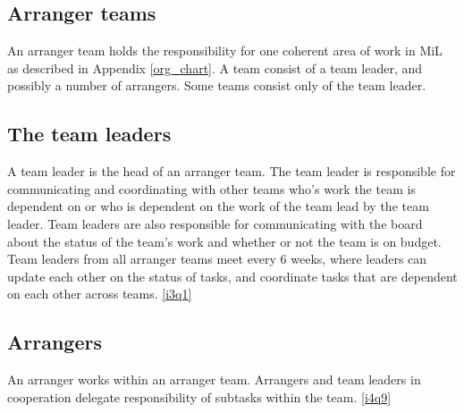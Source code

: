 \subsection{Arranger teams} %
\label{sub:arranger_team}
An arranger team holds the responsibility for one coherent area of work in MiL as described in Appendix \ref{org_chart}. A team consist of a team leader, and possibly a number of arrangers. Some teams consist only of the team leader.

\subsection{The team leaders}
\label{sub:team_leaders}
A team leader is the head of an arranger team. The team leader is responsible for communicating and coordinating with other teams who's work the team is dependent on or who is dependent on the work of the team lead by the team leader. Team leaders are also responsible for communicating with the board about the status of the team's work and whether or not the team is on budget. Team leaders from all arranger teams meet every 6 weeks, where leaders can update each other on the status of tasks, and coordinate tasks that are dependent on each other across teams. \ref{i3q1}

\subsection{Arrangers}
\label{sub:team_members}
An arranger works within an arranger team. Arrangers and team leaders in cooperation delegate responsibility of subtasks within the team. \ref{i4q9}

